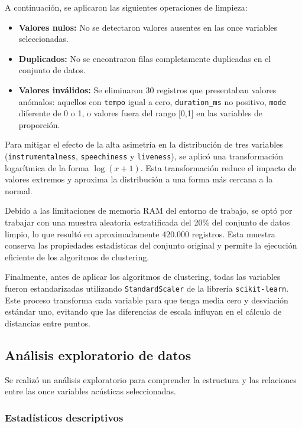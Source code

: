 A continuación, se aplicaron las siguientes operaciones de limpieza:

\begin{itemize}
    \item \textbf{Valores nulos:} No se detectaron valores ausentes en las once variables seleccionadas.
    \item \textbf{Duplicados:} No se encontraron filas completamente duplicadas en el conjunto de datos.
    \item \textbf{Valores inválidos:} Se eliminaron 30 registros que presentaban valores anómalos: aquellos con \texttt{tempo} igual a cero, \texttt{duration\_ms} no positivo, \texttt{mode} diferente de 0 o 1, o valores fuera del rango [0,1] en las variables de proporción.
\end{itemize}

Para mitigar el efecto de la alta asimetría en la distribución de tres variables (\texttt{instrumentalness}, \texttt{speechiness} y \texttt{liveness}), se aplicó una transformación logarítmica de la forma $\log(x+1)$. Esta transformación reduce el impacto de valores extremos y aproxima la distribución a una forma más cercana a la normal.

Debido a las limitaciones de memoria RAM del entorno de trabajo, se optó por trabajar con una muestra aleatoria estratificada del 20\% del conjunto de datos limpio, lo que resultó en aproximadamente 420.000 registros. Esta muestra conserva las propiedades estadísticas del conjunto original y permite la ejecución eficiente de los algoritmos de clustering.

Finalmente, antes de aplicar los algoritmos de clustering, todas las variables fueron estandarizadas utilizando \texttt{StandardScaler} de la librería \texttt{scikit-learn}. Este proceso transforma cada variable para que tenga media cero y desviación estándar uno, evitando que las diferencias de escala influyan en el cálculo de distancias entre puntos.

\subsection{Análisis exploratorio de datos}

Se realizó un análisis exploratorio para comprender la estructura y las relaciones entre las once variables acústicas seleccionadas.

\subsubsection{Estadísticos descriptivos}

